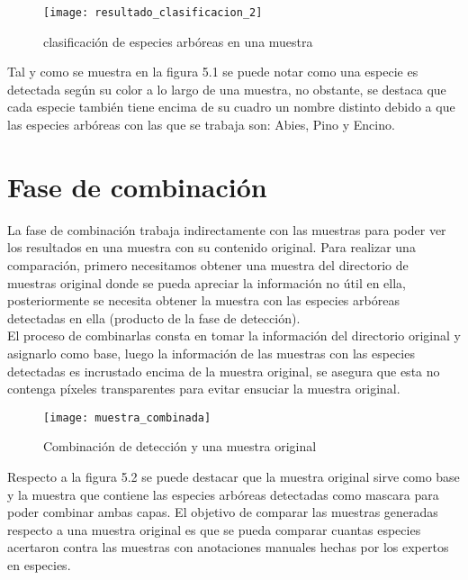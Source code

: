 \begin{figure}[H]
  \centering
  \begin{minipage}[b]{0.8\textwidth}
        \texttt{[image: resultado\_clasificacion\_2]}
    \caption{clasificación de especies arbóreas en una muestra}
  \end{minipage}
\end{figure}

Tal y como se muestra en la figura 5.1  se puede notar como una especie es detectada según su color a lo largo de una muestra, no obstante, se destaca que cada especie también tiene encima de su cuadro un nombre distinto debido a que las especies arbóreas con las que se trabaja son: Abies, Pino y Encino. 

\section{Fase de combinación}
La fase de combinación trabaja indirectamente con las muestras para poder ver los resultados en una muestra con su contenido original. Para realizar una comparación, primero necesitamos obtener una muestra del directorio de muestras original donde se pueda apreciar la información no útil en ella, posteriormente se necesita obtener la muestra con las especies arbóreas detectadas en ella (producto de la fase de detección).\\ 

El proceso de combinarlas consta en tomar la información del directorio original y asignarlo como base, luego la información de las muestras con las especies detectadas es incrustado encima de la muestra original, se asegura que esta no contenga píxeles transparentes para evitar ensuciar la muestra original.


\begin{figure}[H]
  \centering
  \begin{minipage}[b]{0.8\textwidth}
        \texttt{[image: muestra\_combinada]}
    \caption{Combinación de detección y una muestra original}
  \end{minipage}
\end{figure}
\newpage

Respecto a la figura 5.2 se puede destacar que la muestra original sirve como base y la muestra que contiene las especies arbóreas detectadas como mascara para poder combinar ambas capas. El objetivo de comparar las muestras generadas respecto a una muestra original es que se pueda comparar cuantas especies acertaron contra las muestras con anotaciones manuales hechas por los expertos en especies.

